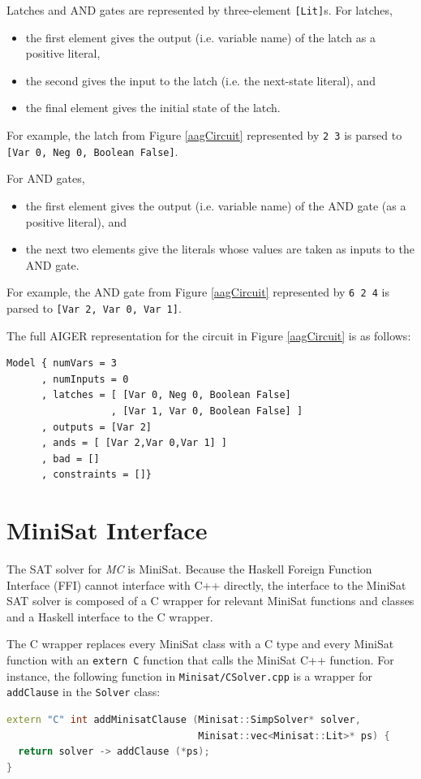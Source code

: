 \documentclass[12pt,a4paper,twoside,openright]{report}
\begin{document}
{{Latches and AND gates are represented by three-element \verb,[Lit],s. For latches,
\begin{itemize}
\item the first element gives the output (i.e. variable name)
of the latch as a positive literal,
\item the second gives the input to the latch (i.e. the next-state literal), and
\item the final element gives the initial state
of the latch.
\end{itemize}
For example, the latch from Figure \ref{aagCircuit} represented by \verb,2 3, is parsed
to \verb.[Var 0, Neg 0, Boolean False]..

For AND gates,
\begin{itemize}
\item the first element gives the output (i.e. variable name) of the AND gate
(as a positive literal), and
\item the next two elements give the literals whose values are taken
as inputs to the AND gate.
\end{itemize}
For example, the AND gate from Figure \ref{aagCircuit} represented by \verb,6 2 4, is
parsed to \verb.[Var 2, Var 0, Var 1]..

The full AIGER representation for the circuit in Figure \ref{aagCircuit} is
as follows:
\begin{verbatim}
Model { numVars = 3
      , numInputs = 0
      , latches = [ [Var 0, Neg 0, Boolean False]
                  , [Var 1, Var 0, Boolean False] ]
      , outputs = [Var 2]
      , ands = [ [Var 2,Var 0,Var 1] ]
      , bad = []
      , constraints = []}
\end{verbatim}

\section{MiniSat Interface}
\label{impl:minisat}

The SAT solver for \emph{MC} is MiniSat.
Because the Haskell Foreign Function Interface (FFI) cannot interface with C++ directly,
the interface to the MiniSat SAT solver is composed of a C wrapper for relevant
MiniSat functions and classes and a Haskell interface to the C wrapper.

The C wrapper replaces every MiniSat class with a C type and every MiniSat function with
an \verb,extern C, function that calls the MiniSat C++ function.
For instance, the following function
in \verb,Minisat/CSolver.cpp, is a wrapper for \verb,addClause, in the \verb,Solver,
class:
\begin{lstlisting}[language = C++]
extern "C" int addMinisatClause (Minisat::SimpSolver* solver,
                                 Minisat::vec<Minisat::Lit>* ps) {
  return solver -> addClause (*ps);
}
\end{lstlisting}

}}
\end{document}
